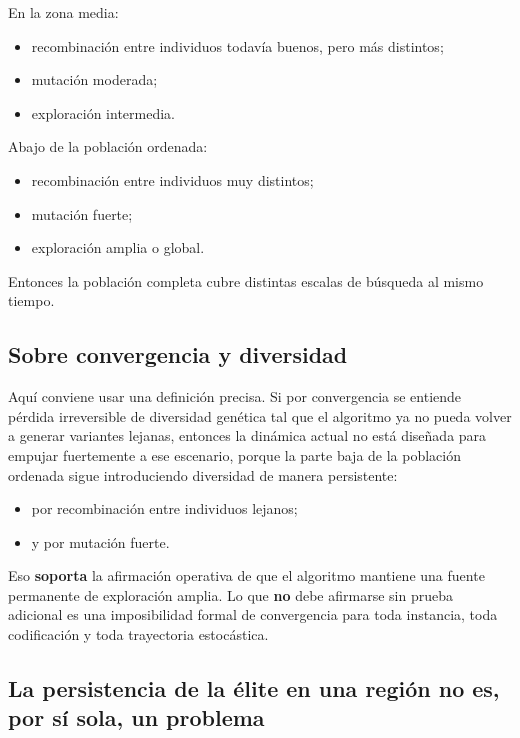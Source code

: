 \documentclass[11pt]{article}
\begin{document}
En la zona media:

\begin{itemize}
  \item recombinaci\'on entre individuos todav\'ia buenos, pero m\'as
  distintos;
  \item mutaci\'on moderada;
  \item exploraci\'on intermedia.
\end{itemize}

Abajo de la poblaci\'on ordenada:

\begin{itemize}
  \item recombinaci\'on entre individuos muy distintos;
  \item mutaci\'on fuerte;
  \item exploraci\'on amplia o global.
\end{itemize}

Entonces la poblaci\'on completa cubre distintas escalas de b\'usqueda al mismo
tiempo.

\subsection{Sobre convergencia y diversidad}

Aqu\'i conviene usar una definici\'on precisa. Si por convergencia se entiende
p\'erdida irreversible de diversidad gen\'etica tal que el algoritmo ya no pueda
volver a generar variantes lejanas, entonces la din\'amica actual no est\'a
dise\~nada para empujar fuertemente a ese escenario, porque la parte baja de la
poblaci\'on ordenada sigue introduciendo diversidad de manera persistente:

\begin{itemize}
  \item por recombinaci\'on entre individuos lejanos;
  \item y por mutaci\'on fuerte.
\end{itemize}

Eso \textbf{soporta} la afirmaci\'on operativa de que el algoritmo mantiene una
fuente permanente de exploraci\'on amplia. Lo que \textbf{no} debe afirmarse
sin prueba adicional es una imposibilidad formal de convergencia para toda
instancia, toda codificaci\'on y toda trayectoria estoc\'astica.

\subsection{La persistencia de la \'elite en una regi\'on no es, por s\'i sola,
un problema}
\end{document}
